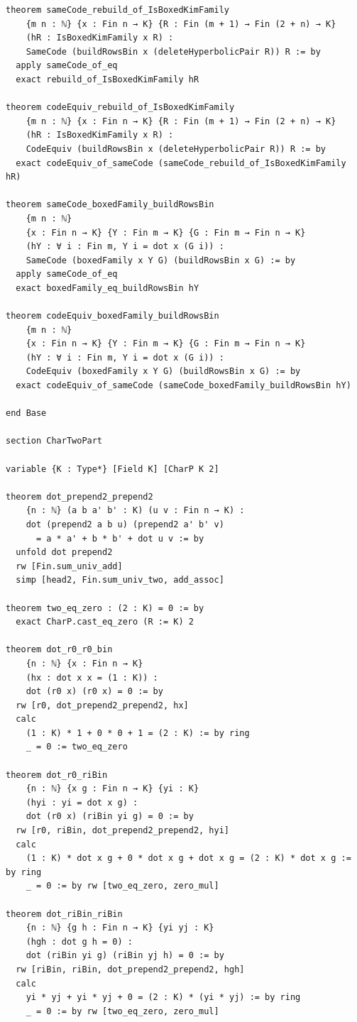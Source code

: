 \documentclass[12pt]{article}
\begin{document}
\begin{lstlisting}[caption={Lean verification for Theorem~\ref{thm:CZ_Kim_Lagrangian}.}]
theorem sameCode_rebuild_of_IsBoxedKimFamily
    {m n : ℕ} {x : Fin n → K} {R : Fin (m + 1) → Fin (2 + n) → K}
    (hR : IsBoxedKimFamily x R) :
    SameCode (buildRowsBin x (deleteHyperbolicPair R)) R := by
  apply sameCode_of_eq
  exact rebuild_of_IsBoxedKimFamily hR

theorem codeEquiv_rebuild_of_IsBoxedKimFamily
    {m n : ℕ} {x : Fin n → K} {R : Fin (m + 1) → Fin (2 + n) → K}
    (hR : IsBoxedKimFamily x R) :
    CodeEquiv (buildRowsBin x (deleteHyperbolicPair R)) R := by
  exact codeEquiv_of_sameCode (sameCode_rebuild_of_IsBoxedKimFamily hR)

theorem sameCode_boxedFamily_buildRowsBin
    {m n : ℕ}
    {x : Fin n → K} {Y : Fin m → K} {G : Fin m → Fin n → K}
    (hY : ∀ i : Fin m, Y i = dot x (G i)) :
    SameCode (boxedFamily x Y G) (buildRowsBin x G) := by
  apply sameCode_of_eq
  exact boxedFamily_eq_buildRowsBin hY

theorem codeEquiv_boxedFamily_buildRowsBin
    {m n : ℕ}
    {x : Fin n → K} {Y : Fin m → K} {G : Fin m → Fin n → K}
    (hY : ∀ i : Fin m, Y i = dot x (G i)) :
    CodeEquiv (boxedFamily x Y G) (buildRowsBin x G) := by
  exact codeEquiv_of_sameCode (sameCode_boxedFamily_buildRowsBin hY)

end Base

section CharTwoPart

variable {K : Type*} [Field K] [CharP K 2]

theorem dot_prepend2_prepend2
    {n : ℕ} (a b a' b' : K) (u v : Fin n → K) :
    dot (prepend2 a b u) (prepend2 a' b' v)
      = a * a' + b * b' + dot u v := by
  unfold dot prepend2
  rw [Fin.sum_univ_add]
  simp [head2, Fin.sum_univ_two, add_assoc]

theorem two_eq_zero : (2 : K) = 0 := by
  exact CharP.cast_eq_zero (R := K) 2

theorem dot_r0_r0_bin
    {n : ℕ} {x : Fin n → K}
    (hx : dot x x = (1 : K)) :
    dot (r0 x) (r0 x) = 0 := by
  rw [r0, dot_prepend2_prepend2, hx]
  calc
    (1 : K) * 1 + 0 * 0 + 1 = (2 : K) := by ring
    _ = 0 := two_eq_zero

theorem dot_r0_riBin
    {n : ℕ} {x g : Fin n → K} {yi : K}
    (hyi : yi = dot x g) :
    dot (r0 x) (riBin yi g) = 0 := by
  rw [r0, riBin, dot_prepend2_prepend2, hyi]
  calc
    (1 : K) * dot x g + 0 * dot x g + dot x g = (2 : K) * dot x g := by ring
    _ = 0 := by rw [two_eq_zero, zero_mul]

theorem dot_riBin_riBin
    {n : ℕ} {g h : Fin n → K} {yi yj : K}
    (hgh : dot g h = 0) :
    dot (riBin yi g) (riBin yj h) = 0 := by
  rw [riBin, riBin, dot_prepend2_prepend2, hgh]
  calc
    yi * yj + yi * yj + 0 = (2 : K) * (yi * yj) := by ring
    _ = 0 := by rw [two_eq_zero, zero_mul]


\end{lstlisting}
\end{document}
